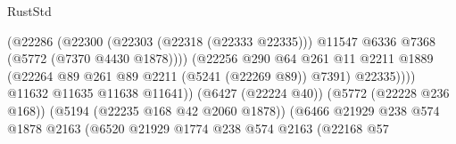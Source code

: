 \begin{lexlean}{RustStd}
\begin{coremodule}
{\begin{coremodule}
{{{{{{{{{{{{{{{{{{{{{{{{{{{{{                                                      (@22286
                                                        (@22300
                                                          (@22303 (@22318 (@22333 @22335)))
                                                          @11547
                                                          @6336
                                                          @7368
                                                          (@5772 (@7370 @4430 @1878))))
                                                      (@22256
                                                        @290
                                                        @64
                                                        @261
                                                        @11
                                                        @2211
                                                        @1889
                                                        (@22264
                                                          @89
                                                          @261
                                                          @89
                                                          @2211
                                                          (@5241 (@22269 @89))
                                                          @7391)
                                                        @22335))))
                                                @11632
                                                @11635
                                                @11638
                                                @11641))
                                            (@6427 (@22224 @40))
                                            (@5772 (@22228 @236 @168))
                                            (@5194 (@22235 @168 @42 @2060 @1878))
                                            (@6466
                                              @21929
                                              @238
                                              @574
                                              @1878
                                              @2163
                                              (@6520
                                                @21929
                                                @1774
                                                @238
                                                @574
                                                @2163
                                                (@22168
                                                  @57
}}}}}}}}}}}}}}}}}}}}}}}}}}}}}
\end{coremodule}}
\end{coremodule}
\end{lexlean}
